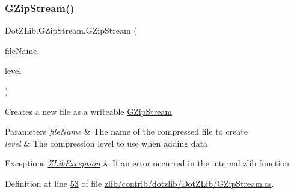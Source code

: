 \mbox{\label{class_dot_z_lib_1_1_g_zip_stream_a12d73ef46491a5023b1fd620efb13f1a}} 
\subsubsection{\texorpdfstring{G\+Zip\+Stream()}{GZipStream()}\hspace{0.1cm}{\footnotesize\ttfamily [3/4]}}
{\footnotesize\ttfamily Dot\+Z\+Lib.\+G\+Zip\+Stream.\+G\+Zip\+Stream (\begin{DoxyParamCaption}\item[{string}]{file\+Name,  }\item[{\hyperlink{namespace_dot_z_lib_a034f7a1ef9856d8834e6f6b1c53d8a4c}{Compress\+Level}}]{level }\end{DoxyParamCaption})\hspace{0.3cm}{\ttfamily [inline]}}



Creates a new file as a writeable \hyperlink{class_dot_z_lib_1_1_g_zip_stream}{G\+Zip\+Stream} 


\begin{DoxyParams}{Parameters}
{\em file\+Name} & The name of the compressed file to create\\
\hline
{\em level} & The compression level to use when adding data\\
\hline
\end{DoxyParams}

\begin{DoxyExceptions}{Exceptions}
{\em \hyperlink{class_dot_z_lib_1_1_z_lib_exception}{Z\+Lib\+Exception}} & If an error occurred in the internal zlib function\\
\hline
\end{DoxyExceptions}


Definition at line \hyperlink{zlib_2contrib_2dotzlib_2_dot_z_lib_2_g_zip_stream_8cs_source_l00053}{53} of file \hyperlink{zlib_2contrib_2dotzlib_2_dot_z_lib_2_g_zip_stream_8cs_source}{zlib/contrib/dotzlib/\+Dot\+Z\+Lib/\+G\+Zip\+Stream.\+cs}.

\mbox{\label{class_dot_z_lib_1_1_g_zip_stream_aea152a18b8cab1ee3d614fc3799c7e08}} 
